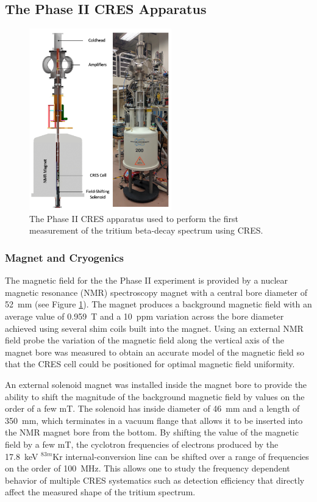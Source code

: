 \subsection{The Phase II CRES Apparatus}

\begin{figure}[htbp]
    \centering
    \includegraphics[width=0.55\textwidth]{figs/Chapter-3/phaseII_system.png}
    \caption{\label{fig:chap3-phase2-apparatus} The Phase II CRES apparatus used to perform the first measurement of the tritium beta-decay spectrum using CRES.}
\end{figure}

\subsubsection*{Magnet and Cryogenics}

The magnetic field for the the Phase II experiment is provided by a nuclear magnetic resonance (NMR) spectroscopy magnet with a central bore diameter of 52~mm (see Figure \ref{fig:chap3-phase2-apparatus}). The magnet produces a background magnetic field with an average value of 0.959~T and a 10~ppm variation across the bore diameter achieved using several shim coils built into the magnet. Using an external NMR field probe the variation of the magnetic field along the vertical axis of the magnet bore was measured to obtain an accurate model of the magnetic field so that the CRES cell could be positioned for optimal magnetic field uniformity.

An external solenoid magnet was installed inside the magnet bore to provide the ability to shift the magnitude of the background magnetic field by values on the order of a few mT. The solenoid has inside diameter of 46~mm and a length of 350~mm, which terminates in a vacuum flange that allows it to be inserted into the NMR magnet bore from the bottom. By shifting the value of the magnetic field by a few mT, the cyclotron frequencies of electrons produced by the 17.8~keV $^{83m}$Kr internal-conversion line can be shifted over a range of frequencies on the order of 100~MHz. This allows one to study the frequency dependent behavior of multiple CRES systematics such as detection efficiency that directly affect the measured shape of the tritium spectrum. 

